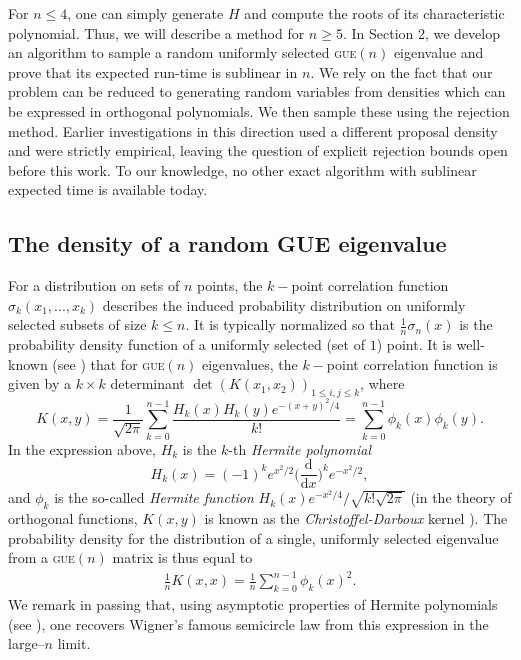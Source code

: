 \documentclass[10pt]{article}
\theoremstyle{definition}
\theoremstyle{remark}
\newcommand{\1}{\mathbbm{1}}
\newcommand{\0}{\mathbbm{0}}
\begin{document}
For $n\leq 4$, one can simply generate $H$ and compute the roots of its characteristic polynomial. Thus, we will describe a method for $n\geq 5$. 
In Section 2, we develop an algorithm to sample a random uniformly selected \textsc{gue}$(n)$ eigenvalue and prove that its expected run-time is sublinear in $n$. We rely on the fact that our problem can be reduced to generating random variables from densities which can be expressed in orthogonal polynomials. We then sample these using the rejection method. Earlier investigations in this direction \cite{baskerville2022, baskerville2022b} used a different proposal density and were strictly empirical, leaving the question of explicit rejection bounds open before this work.  To our knowledge, no other exact algorithm with sublinear expected time is available today. 

\medskip
\subsection{The density of a random GUE eigenvalue}

For a distribution on sets of $n$ points, the $k-$point correlation function $\sigma_k(x_1,...,x_k)$ describes the induced probability distribution on uniformly selected subsets of size $k\leq n$. It is typically normalized so that $\frac{1}{n}\sigma_n(x)$ is the probability density function of a uniformly selected (set of $1$) point. It is well-known  (see \cite{edelman}) that for {\textsc{gue}}$(n)$ eigenvalues, the $k-$point correlation function is given by a $k\times k$ determinant $\det(K(x_1,x_2))_{1\leq i,j\leq k}$, where
\[
    K(x,y) = \frac{1}{\sqrt{2\pi}}\sum_{k=0}^{n-1}\frac{H_k(x)H_k(y)e^{-(x+y)^2/4}}{k!} = \sum_{k=0}^{n-1}\phi_k(x)\phi_k(y).
\]
In the expression above, $H_k$ is the $k$-th \textit{Hermite polynomial}
\[
    H_k(x) = (-1)^ke^{x^2/2}\bigg(\frac{\mathrm{d}}{\mathrm{d}x}\bigg)^ke^{-x^2/2},
\]
and $\phi_k$ is the so-called \textit{Hermite function} $H_k(x)e^{-x^2/4}/\sqrt{k!\sqrt{2\pi}}$ (in the theory of orthogonal functions, $K(x,y)$ is known as the \textit{Christoffel-Darboux} kernel \cite{szego}). The probability density for the distribution of a single, uniformly selected eigenvalue from a {\textsc{gue}}$(n)$ matrix is thus equal to 
\begin{align}\label{density}
   \frac{1}{n}K(x,x)=\frac{1}{n}\sum_{k=0}^{n-1}\phi_k(x)^2.
\end{align}
We remark in passing that, using asymptotic properties of Hermite polynomials (see \cite{mehta}), one recovers Wigner's famous semicircle law \cite{wigner} from this expression in the large--$n$ limit.
\end{document}
